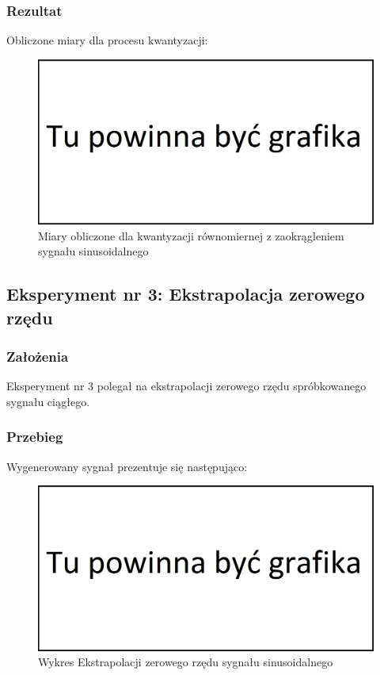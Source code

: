 \documentclass[12pt]{article}
\begin{document}
\subsubsection{Rezultat}
Obliczone miary dla procesu kwantyzacji:
\begin{figure}[H]
	\centering
	\includegraphics[width=\linewidth]{tmp.jpg}
	\caption{Miary obliczone dla kwantyzacji równomiernej z zaokrągleniem sygnału sinusoidalnego}
	\label{Wartości dla eksperymentu 2}
\end{figure}



\newpage
\subsection{Eksperyment nr 3: Ekstrapolacja zerowego rzędu}


\subsubsection{Założenia}
Eksperyment nr 3 polegał na ekstrapolacji zerowego rzędu spróbkowanego sygnału ciągłego.
\subsubsection{Przebieg}
Wygenerowany sygnał prezentuje się następująco:
\begin{figure}[H]
    \centering
	\includegraphics[width=\linewidth]{tmp.jpg}
    \caption{Wykres Ekstrapolacji zerowego rzędu sygnału sinusoidalnego}
    \label{wykres dla eksperymentu 3}
\end{figure}
\end{document}
